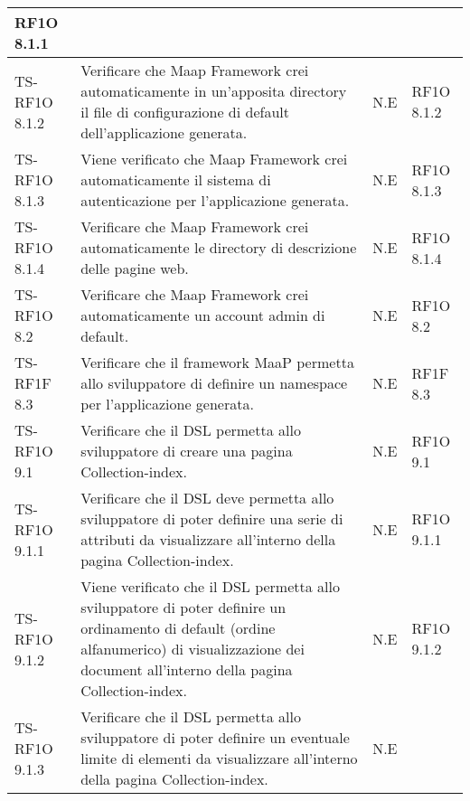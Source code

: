 \begin{center}
\begin{longtable}{| p{3cm} | p{6cm} | p{1.5cm} | p{2cm} | }
            RF1O 8.1.1 \newline  \\ \hline 
        TS-RF1O 8.1.2 & 
        Verificare che Maap Framework crei automaticamente in un’apposita directory il file di configurazione di default dell’applicazione generata. & N.E &       
            RF1O 8.1.2 \newline  \\ \hline 
        TS-RF1O 8.1.3 & 
        Viene verificato che Maap Framework crei automaticamente il sistema di autenticazione per l’applicazione generata. & N.E &       
            RF1O 8.1.3 \newline  \\ \hline 
        TS-RF1O 8.1.4 & 
        Verificare che Maap Framework crei automaticamente le directory di descrizione delle pagine web. & N.E &       
            RF1O 8.1.4 \newline  \\ \hline 
        TS-RF1O 8.2 & 
        Verificare che Maap Framework crei automaticamente un account admin di default. & N.E &       
            RF1O 8.2 \newline  \\ \hline 
        TS-RF1F 8.3 & 
        Verificare che il framework MaaP permetta allo sviluppatore di definire un namespace per l’applicazione generata. & N.E &       
            RF1F 8.3 \newline  \\ \hline 
        TS-RF1O 9.1 & 
        Verificare che il DSL permetta allo sviluppatore di creare una pagina Collection-index. & N.E &       
            RF1O 9.1 \newline  \\ \hline 
        TS-RF1O 9.1.1 & 
        Verificare che il DSL deve permetta allo sviluppatore di poter definire una serie di attributi da visualizzare all’interno della pagina Collection-index. & N.E &       
            RF1O 9.1.1 \newline  \\ \hline 
        TS-RF1O 9.1.2 & 
        Viene verificato che il DSL permetta allo sviluppatore di poter definire un ordinamento di default (ordine alfanumerico) di visualizzazione dei document all'interno della pagina Collection-index. & N.E &       
            RF1O 9.1.2 \newline  \\ \hline 
        TS-RF1O 9.1.3 & 
        Verificare che il DSL permetta allo sviluppatore di poter definire un eventuale limite di elementi da visualizzare all’interno della pagina Collection-index. & N.E &       

\end{longtable}
\end{center}
